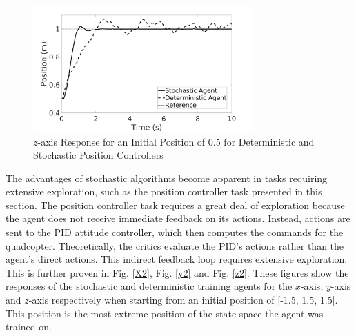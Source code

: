     \begin{figure}[H]
            \centering
            \includegraphics[width=0.75\textwidth]{plots/z1.jpg}
            \caption{$z$-axis Response for an Initial Position of 0.5 for Deterministic and Stochastic Position Controllers}
            \label{z1}
    \end{figure}
    \clearpage
    The advantages of stochastic algorithms become apparent in tasks requiring extensive exploration, such as the position controller task presented in this section. The position controller task requires a great deal of exploration because the agent does not receive immediate feedback on its actions. Instead, actions are sent to the PID attitude controller, which then computes the commands for the quadcopter. Theoretically, the critics evaluate the PID's actions rather than the agent's direct actions. This indirect feedback loop requires extensive exploration.\\

    This is further proven in Fig. \ref{X2}, Fig. \ref{y2} and Fig. \ref{z2}. These figures show the responses of the stochastic and deterministic training agents for the $x$-axis, $y$-axis and $z$-axis respectively when starting from an initial position of [-1.5, 1.5, 1.5]. This position is the most extreme position of the state space the agent was trained on.\\
    
